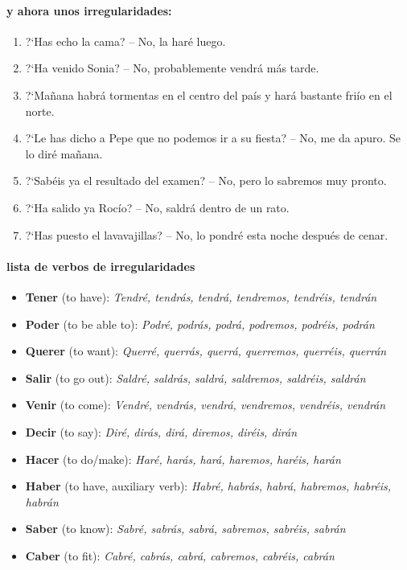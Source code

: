\documentclass{article}
\begin{document}
\vspace{15pt}

\paragraph{y ahora unos irregularidades:}
\begin{enumerate}
  \item ?`Has echo la cama? -- No, la har\'e luego.
  \item ?`Ha venido Sonia? -- No, probablemente vendr\'a m\'as tarde.
  \item ?`Ma\~nana habr\'a tormentas en el centro del pa\'is y har\'a bastante fri\'io en el norte.
  \item ?`Le has dicho a Pepe que no podemos ir a su fiesta? -- No, me da apuro. Se lo dir\'e ma\~nana.
  \item ?`Sab\'eis ya el resultado del examen? -- No, pero lo sabremos muy pronto.
  \item ?`Ha salido ya Roc\'io? -- No, saldr\'a dentro de un rato.
  \item ?`Has puesto el lavavajillas? -- No, lo pondr\'e esta noche despu\'es de cenar. 
\end{enumerate}


\paragraph{lista de verbos de irregularidades}
\begin{itemize}
\item \textbf{Tener} (to have): \textit{Tendré, tendrás, tendrá, tendremos, tendréis, tendrán}
\item \textbf{Poder} (to be able to): \textit{Podré, podrás, podrá, podremos, podréis, podrán}
\item \textbf{Querer} (to want): \textit{Querré, querrás, querrá, querremos, querréis, querrán}
\item \textbf{Salir} (to go out): \textit{Saldré, saldrás, saldrá, saldremos, saldréis, saldrán}
\item \textbf{Venir} (to come): \textit{Vendré, vendrás, vendrá, vendremos, vendréis, vendrán}
\item \textbf{Decir} (to say): \textit{Diré, dirás, dirá, diremos, diréis, dirán}
\item \textbf{Hacer} (to do/make): \textit{Haré, harás, hará, haremos, haréis, harán}
\item \textbf{Haber} (to have, auxiliary verb): \textit{Habré, habrás, habrá, habremos, habréis, habrán}
\item \textbf{Saber} (to know): \textit{Sabré, sabrás, sabrá, sabremos, sabréis, sabrán}
\item \textbf{Caber} (to fit): \textit{Cabré, cabrás, cabrá, cabremos, cabréis, cabrán}
\end{itemize}
\end{document}
